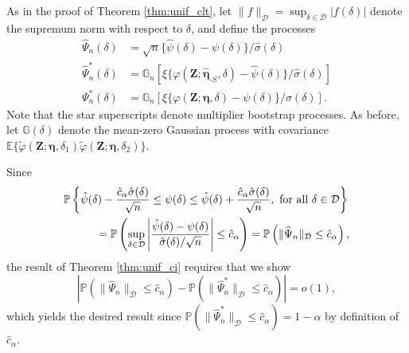 \documentclass[12pt]{article}
\newcommand{\Pb}{\mathbb{P}}
\newcommand{\Gn}{\mathbb{G}_n}
\newcommand{\Gb}{\mathbb{G}}
\newcommand{\E}{\mathbb{E}}
\newcommand{\bZ}{\mathbf{Z}}
\theoremstyle{remark}
\begin{document}
As in the proof of Theorem \ref{thm:unif_clt}, let $\| f \|_\mathcal{D} = \sup_{\delta \in \mathcal{D}} | f(\delta) |$ denote the supremum norm with respect to $\delta$, and define the processes
\begin{align*}
\widehat\Psi_n(\delta) &= \sqrt{n} \{\hat\psi(\delta) - \psi(\delta)\} / \hat\sigma(\delta) \\
\widehat\Psi_n^*(\delta) &= \Gn[\xi \{ \varphi(\bZ;\hat{\boldsymbol\eta}_{\text{-}S},\delta)-\hat\psi(\delta)\} /\hat\sigma(\delta) ]  \\
\Psi_n^*(\delta) &= \Gn[\xi \{ \varphi(\bZ;\boldsymbol{\eta}, \delta)-\psi(\delta)\} /\sigma(\delta) ]  .
\end{align*}
Note that the star superscripts denote multiplier bootstrap processes. As before, let $\Gb(\delta)$ denote the mean-zero Gaussian process with covariance $\E\{ \widetilde\varphi(\bZ;\boldsymbol\eta,\delta_1)\widetilde\varphi(\bZ;\boldsymbol\eta,\delta_2) \}$. 

Since
\begin{align*}
&\Pb \left\{ \hat\psi(\delta) - \frac{ \hat{c}_\alpha \hat\sigma(\delta)}{\sqrt{n} } \leq \psi(\delta) \leq \hat\psi(\delta) +  \frac{ \hat{c}_\alpha \hat\sigma(\delta)}{\sqrt{n} }, \text{ for all } \delta \in \mathcal{D} \right\} \\
& \hspace{.4in} = \Pb\left( \sup_{\delta \in \mathcal{D}} \left| \frac{\hat\psi(\delta) - \psi(\delta)}{\hat\sigma(\delta)/\sqrt{n}} \right| \leq \hat{c}_\alpha \right) = \Pb\left(  \| \widehat\Psi_n \|_\mathcal{D} \leq \hat{c}_\alpha \right) ,
\end{align*}
the result of Theorem \ref{thm:unif_ci} requires that we show
$$ \left| \Pb\left(  \| \widehat\Psi_n \|_\mathcal{D} \leq \hat{c}_\alpha \right) - \Pb\left(  \| \widehat\Psi^*_n \|_\mathcal{D} \leq \hat{c}_\alpha \right) \right| =  o(1) , $$
which yields the desired result since $\Pb(  \| \widehat\Psi^*_n \|_\mathcal{D} \leq \hat{c}_\alpha )=1-\alpha$ by definition of $\hat{c}_\alpha$. 
\end{document}
